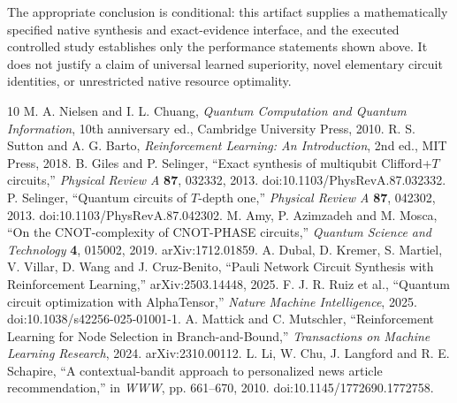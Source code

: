 \documentclass[11pt]{article}
\begin{document}
The appropriate conclusion is conditional: this artifact supplies a mathematically specified native synthesis and exact-evidence interface, and the executed controlled study establishes only the performance statements shown above. It does not justify a claim of universal learned superiority, novel elementary circuit identities, or unrestricted native resource optimality.

\begin{thebibliography}{10}
 M. A. Nielsen and I. L. Chuang, \emph{Quantum Computation and Quantum Information}, 10th anniversary ed., Cambridge University Press, 2010.
 R. S. Sutton and A. G. Barto, \emph{Reinforcement Learning: An Introduction}, 2nd ed., MIT Press, 2018.
 B. Giles and P. Selinger, ``Exact synthesis of multiqubit Clifford+$T$ circuits,'' \emph{Physical Review A} \textbf{87}, 032332, 2013. doi:10.1103/PhysRevA.87.032332.
 P. Selinger, ``Quantum circuits of $T$-depth one,'' \emph{Physical Review A} \textbf{87}, 042302, 2013. doi:10.1103/PhysRevA.87.042302.
 M. Amy, P. Azimzadeh and M. Mosca, ``On the CNOT-complexity of CNOT-PHASE circuits,'' \emph{Quantum Science and Technology} \textbf{4}, 015002, 2019. arXiv:1712.01859.
 A. Dubal, D. Kremer, S. Martiel, V. Villar, D. Wang and J. Cruz-Benito, ``Pauli Network Circuit Synthesis with Reinforcement Learning,'' arXiv:2503.14448, 2025.
 F. J. R. Ruiz et al., ``Quantum circuit optimization with AlphaTensor,'' \emph{Nature Machine Intelligence}, 2025. doi:10.1038/s42256-025-01001-1.
 A. Mattick and C. Mutschler, ``Reinforcement Learning for Node Selection in Branch-and-Bound,'' \emph{Transactions on Machine Learning Research}, 2024. arXiv:2310.00112.
 L. Li, W. Chu, J. Langford and R. E. Schapire, ``A contextual-bandit approach to personalized news article recommendation,'' in \emph{WWW}, pp. 661--670, 2010. doi:10.1145/1772690.1772758.
\end{thebibliography}
\end{document}
